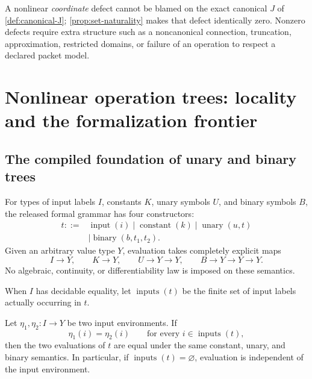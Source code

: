 \begin{boundary}
A nonlinear \emph{coordinate} defect cannot be blamed on the exact canonical
$J$ of \cref{def:canonical-J}; \cref{prop:set-naturality} makes that defect
identically zero.  Nonzero defects require extra structure such as a
noncanonical connection, truncation, approximation, restricted domains, or
failure of an operation to respect a declared packet model.
\end{boundary}

\clearpage\section{Nonlinear operation trees: locality and the formalization frontier}
\label{sec:operation-trees}

\subsection{The compiled foundation of unary and binary trees}

\begin{definition}
\label{def:compiled-operation-tree}
For types of input labels $I$, constants $K$, unary symbols $U$, and binary
symbols $B$, the released formal grammar has four constructors:
\[
\begin{aligned}
t ::={}&\operatorname{input}(i)
\mid\operatorname{constant}(k)
\mid\operatorname{unary}(u,t)\\
&\mid\operatorname{binary}(b,t_1,t_2).
\end{aligned}
\]
Given an arbitrary value type $Y$, evaluation takes completely explicit maps
\[
I\to Y,\qquad K\to Y,\qquad U\to Y\to Y,\qquad
B\to Y\to Y\to Y.
\]
No algebraic, continuity, or differentiability law is imposed on these
semantics.
\end{definition}

When $I$ has decidable equality, let $\operatorname{inputs}(t)$ be the finite
set of input labels actually occurring in $t$.

\begin{theorem}
\label{thm:tree-locality}
Let $\eta_1,\eta_2:I\to Y$ be two input environments.  If
\[
\eta_1(i)=\eta_2(i)
\qquad\text{for every }i\in\operatorname{inputs}(t),
\]
then the two evaluations of $t$ are equal under the same constant, unary, and
binary semantics.  In particular, if
$\operatorname{inputs}(t)=\varnothing$, evaluation is independent of the
input environment.
\end{theorem}

